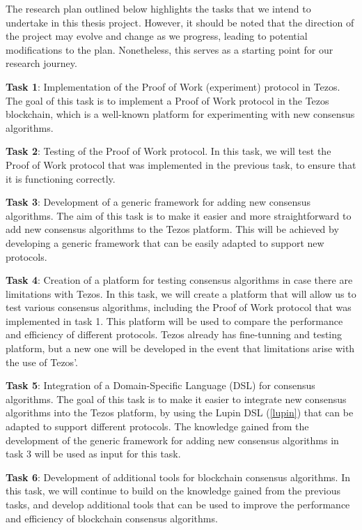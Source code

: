 The research plan outlined below highlights the tasks that we intend to undertake in this thesis project. However, it should be noted that the direction of the project may evolve and change as we progress, leading to potential modifications to the plan. Nonetheless, this serves as a starting point for our research journey.

\textbf{Task 1}: Implementation of the Proof of Work (experiment) protocol in Tezos. The goal of this task is to implement a Proof of Work protocol in the Tezos blockchain, which is a well-known platform for experimenting with new consensus algorithms.

\textbf{Task 2}: Testing of the Proof of Work protocol. In this task, we will test the Proof of Work protocol that was implemented in the previous task, to ensure that it is functioning correctly.

\textbf{Task 3}: Development of a generic framework for adding new consensus algorithms. The aim of this task is to make it easier and more straightforward to add new consensus algorithms to the Tezos platform. This will be achieved by developing a generic framework that can be easily adapted to support new protocols.

\textbf{Task 4}: Creation of a platform for testing consensus algorithms in case there are limitations with Tezos. In this task, we will create a platform that will allow us to test various consensus algorithms, including the Proof of Work protocol that was implemented in task 1. This platform will be used to compare the performance and efficiency of different protocols. Tezos already has fine-tunning and testing platform, but a new one will be developed in the event that limitations arise with the use of Tezos'.

\textbf{Task 5}: Integration of a Domain-Specific Language (DSL) for consensus algorithms. The goal of this task is to make it easier to integrate new consensus algorithms into the Tezos platform, by using the Lupin DSL (\ref{lupin}) that can be adapted to support different protocols. The knowledge gained from the development of the generic framework for adding new consensus algorithms in task 3 will be used as input for this task.

\textbf{Task 6}: Development of additional tools for blockchain consensus algorithms. In this task, we will continue to build on the knowledge gained from the previous tasks, and develop additional tools that can be used to improve the performance and efficiency of blockchain consensus algorithms.

